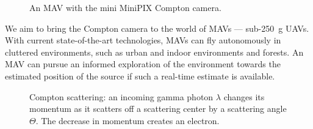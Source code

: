 \documentclass[a4paper,11pt,titlepage,twoside]{book}
\begin{document}

\begin{figure}
  \centering
  \hfill%
  \caption{An \ac{MAV} with the mini MiniPIX Compton camera.}
  \label{fig:timepix}
\end{figure}


We aim to bring the Compton camera to the world of \acp{MAV} --- sub-\SI{250}{\gram} \acp{UAV}.
With current state-of-the-art technologies, \acp{MAV} can fly autonomously in cluttered environments, such as urban and indoor environments and forests.
An \ac{MAV} can pursue an informed exploration of the environment towards the estimated position of the source if such a real-time estimate is available.


\begin{figure}[!b]
  \centering
  \resizebox{0.25\textwidth}{!}{%
    
  }
  \caption{
    Compton scattering: an incoming gamma photon $\lambda$ changes its momentum as it scatters off a scattering center by a scattering angle $\Theta$.
    The decrease in momentum creates an electron.
  }
  \label{fig:compton_scattering}
\end{figure}
\end{document}
